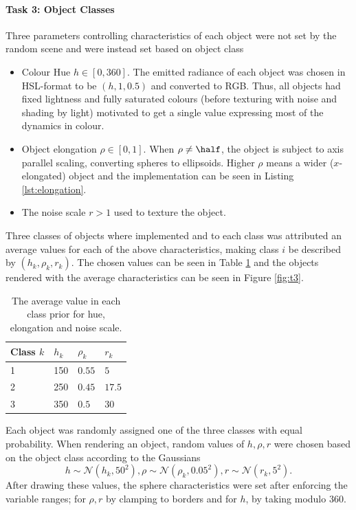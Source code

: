 \documentclass[12pt,fleqn]{article}
\begin{document}
\paragraph{Task 3: Object Classes}
Three parameters controlling characteristics of each object were not set by the random scene and were instead set based on object class
\begin{itemize}
    \item Colour Hue $h \in [0, 360]$. The emitted radiance of each object was chosen in HSL-format to be $(h, 1, 0.5)$ and converted to RGB. Thus, all objects had fixed lightness and fully saturated colours (before texturing with noise and shading by light) motivated to get a single value expressing most of the dynamics in colour.
    \item Object elongation $\rho \in [0, 1]$. When $\rho\ne \half$, the object is subject to axis parallel scaling, converting spheres to ellipsoids. 
        Higher $\rho$ means a wider ($x$-elongated) object and the implementation can be seen in Listing \ref{lst:elongation}.
    \item The noise scale $r > 1$ used to texture the object.
\end{itemize}
Three classes of objects where implemented and to each class was attributed an average values for each of the above characteristics, making class $i$ be described by $(h_k, \rho_k, r_k)$.
The chosen values can be seen in Table \ref{tab:class-avg} and the objects rendered with the average characteristics can be seen in Figure \ref{fig:t3}.
\begin{table}[H]
    \centering
        \begin{tabular}{l|lll}
            Class $k$ & $h_k$ & $\rho_k$ & $r_k$ \\
            \hline
            1 & 150 & $0.55$ & $5$ \\
            2 & 250 & $0.45$ & $17.5$ \\
            3 & 350 & $0.5$ & $30$
        \end{tabular}
    \caption{
        The average value in each class prior for hue, elongation and noise scale.
    }
    \label{tab:class-avg}
\end{table}\noindent
Each object was randomly assigned one of the three classes with equal probability.
When rendering an object, random values of $h, \rho, r$ were chosen based on the object class according to the Gaussians
\begin{equation}
    h \sim \mathcal N\left( h_k, 50^2 \right),
    \rho \sim \mathcal N\left( \rho_k, 0.05^2 \right),
    r \sim \mathcal N\left( r_k, 5^2 \right).
\end{equation}
After drawing these values, the sphere characteristics were set after enforcing the variable ranges; for $\rho, r$ by clamping to borders and for $h$, by taking modulo 360.
\end{document}

